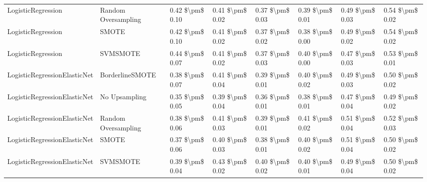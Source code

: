 \begin{tabular}{llllllll}
             LogisticRegression &           Random Oversampling & 0.42 \$\textbackslash pm\$ 0.10 &           0.41 \$\textbackslash pm\$ 0.02 &       0.37 \$\textbackslash pm\$ 0.03 &        0.39 \$\textbackslash pm\$ 0.01 &                         0.49 \$\textbackslash pm\$ 0.03 & 0.54 \$\textbackslash pm\$ 0.02 \\
             LogisticRegression &                         SMOTE & 0.42 \$\textbackslash pm\$ 0.10 &           0.41 \$\textbackslash pm\$ 0.02 &       0.37 \$\textbackslash pm\$ 0.02 &        0.38 \$\textbackslash pm\$ 0.00 &                         0.49 \$\textbackslash pm\$ 0.02 & 0.54 \$\textbackslash pm\$ 0.02 \\
             LogisticRegression &                      SVMSMOTE & 0.44 \$\textbackslash pm\$ 0.07 &           0.41 \$\textbackslash pm\$ 0.02 &       0.37 \$\textbackslash pm\$ 0.03 &        0.40 \$\textbackslash pm\$ 0.00 &                         0.47 \$\textbackslash pm\$ 0.03 & 0.53 \$\textbackslash pm\$ 0.01 \\
   LogisticRegressionElasticNet &               BorderlineSMOTE & 0.38 \$\textbackslash pm\$ 0.07 &           0.41 \$\textbackslash pm\$ 0.04 &       0.39 \$\textbackslash pm\$ 0.01 &        0.40 \$\textbackslash pm\$ 0.02 &                         0.49 \$\textbackslash pm\$ 0.03 & 0.50 \$\textbackslash pm\$ 0.02 \\
   LogisticRegressionElasticNet &                 No Upsampling & 0.35 \$\textbackslash pm\$ 0.05 &           0.39 \$\textbackslash pm\$ 0.04 &       0.36 \$\textbackslash pm\$ 0.01 &        0.38 \$\textbackslash pm\$ 0.01 &                         0.47 \$\textbackslash pm\$ 0.04 & 0.49 \$\textbackslash pm\$ 0.02 \\
   LogisticRegressionElasticNet &           Random Oversampling & 0.38 \$\textbackslash pm\$ 0.06 &           0.41 \$\textbackslash pm\$ 0.03 &       0.39 \$\textbackslash pm\$ 0.01 &        0.41 \$\textbackslash pm\$ 0.02 &                         0.51 \$\textbackslash pm\$ 0.04 & 0.52 \$\textbackslash pm\$ 0.03 \\
   LogisticRegressionElasticNet &                         SMOTE & 0.37 \$\textbackslash pm\$ 0.06 &           0.40 \$\textbackslash pm\$ 0.03 &       0.38 \$\textbackslash pm\$ 0.01 &        0.40 \$\textbackslash pm\$ 0.02 &                         0.51 \$\textbackslash pm\$ 0.04 & 0.50 \$\textbackslash pm\$ 0.02 \\
   LogisticRegressionElasticNet &                      SVMSMOTE & 0.39 \$\textbackslash pm\$ 0.04 &           0.43 \$\textbackslash pm\$ 0.02 &       0.40 \$\textbackslash pm\$ 0.02 &        0.40 \$\textbackslash pm\$ 0.01 &                         0.49 \$\textbackslash pm\$ 0.04 & 0.50 \$\textbackslash pm\$ 0.02 \\

\end{tabular}
